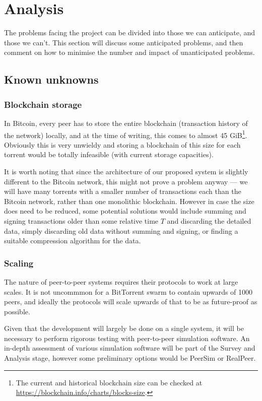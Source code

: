 \documentclass{article}
\begin{document}
\section{Analysis}
The problems facing the project can be divided into those we can anticipate, and those we can't.  This section will discuss some anticipated problems, and then comment on how to minimise the number and impact of unanticipated problems.

\subsection{Known unknowns}

\subsubsection{Blockchain storage}
In Bitcoin, every peer has to store the entire blockchain (transaction history of the network) locally, and at the time of writing, this comes to almost 45 GiB\footnote{The current and historical blockchain size can be checked at \url{https://blockchain.info/charts/blocks-size}.}.  Obviously this is very unwieldy and storing a blockchain of this size for each torrent would be totally infeasible (with current storage capacities).

It is worth noting that since the architecture of our proposed system is slightly different to the Bitcoin network, this might not prove a problem anyway --- we will have many torrents with a smaller number of transactions each than the Bitcoin network, rather than one monolithic blockchain.  However in case the size does need to be reduced, some potential solutions would include summing and signing transactions older than some relative time $T$ and discarding the detailed data, simply discarding old data without summing and signing, or finding a suitable compression algorithm for the data.

\subsubsection{Scaling}
The nature of peer-to-peer systems requires their protocols to work at large scales.  It is not uncommmon for a BitTorrent swarm to contain upwards of 1000 peers, and ideally the protocols will scale upwards of that to be as future-proof as possible.

Given that the development will largely be done on a single system, it will be necessary to perform rigorous testing with peer-to-peer simulation software.  An in-depth assessment of various simulation software will be part of the Survey and Analysis stage, however some preliminary options would be PeerSim or RealPeer.
\end{document}
